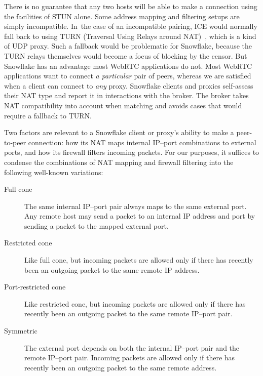 \documentclass[letterpaper,twocolumn]{article}
\begin{document}
There is no guarantee that any two hosts will be able to make
a connection using the facilities of STUN alone.
Some address mapping and
filtering setups are simply incompatible.
In~the case of an incompatible pairing,
ICE would normally fall back to using
TURN (Traversal Using Relays around NAT)~\cite{rfc8656},
which is a kind of UDP proxy.
Such a fallback would be problematic for Snowflake,
because the TURN relays themselves
would become a focus of blocking by the censor.
But Snowflake has an advantage most WebRTC applications do not.
Most WebRTC applications want to connect \emph{a particular} pair of peers,
whereas we are satisfied when a client can connect to \emph{any} proxy.
Snowflake clients and proxies self-assess their NAT type
and report it in interactions with the broker.
The broker takes NAT compatibility into account when matching
and avoids cases that would require a fallback to TURN.


Two factors are relevant to
a Snowflake client or proxy's
ability to make a peer-to-peer connection:
how its NAT maps internal IP--port combinations to external ports,
and how its firewall filters incoming packets.
For our purposes, it suffices
to condense the combinations of NAT mapping and firewall filtering
into the following well-known variations:

\begin{description}
\item[Full cone]
The same internal IP--port pair always maps to the same external port.
Any remote host may send a packet to an internal IP address and port by sending a packet to the
mapped external port.
\item[Restricted cone]
Like full cone,
but incoming packets
are allowed only if
there has recently been an outgoing packet
to the same remote IP address.
\item[Port-restricted cone]
Like restricted cone,
but incoming packets are allowed only if
there has recently been an outgoing packet
to the same remote IP--port pair.
\item[Symmetric]
The external port depends on both
the internal IP--port pair and the remote IP--port pair.
Incoming packets are allowed only if
there has recently been an outgoing
packet to the same remote address.
\end{description}
\end{document}
